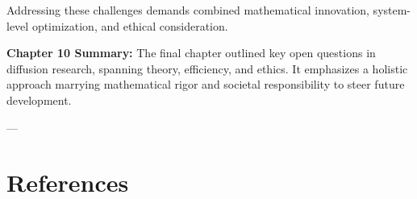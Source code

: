 \documentclass[a4paper,12pt,oneside]{memoir}
\begin{document}
\begin{table}[h]
\centering
{}
\caption{Summary of Open Challenges and Research Directions}
\end{table}

Addressing these challenges demands combined mathematical innovation, system-level optimization, and ethical consideration.

\textbf{Chapter 10 Summary:}  
The final chapter outlined key open questions in diffusion research, spanning theory, efficiency, and ethics. It emphasizes a holistic approach marrying mathematical rigor and societal responsibility to steer future development.

---

\chapter*{References}
\end{document}

